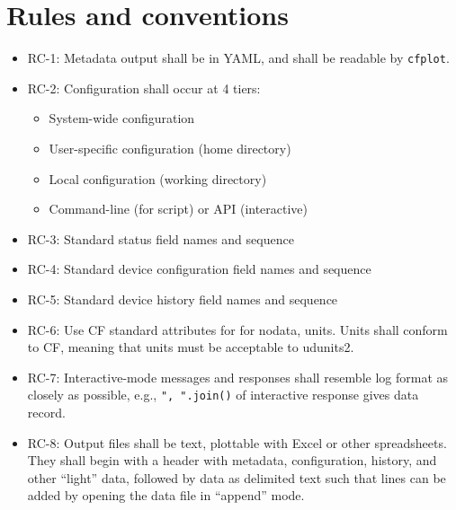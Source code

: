 \documentclass[pdftex,oneside,12pt,a4paper]{book}
\newcommand\linesep{1.68}
\begin{document}
\chapter{Rules and conventions}
\begin{itemize}
\item RC-1: Metadata output shall be in YAML, and shall be readable by \texttt{cfplot}.
\item RC-2: Configuration shall occur at 4 tiers:
  \begin{itemize}
  \item System-wide configuration
  \item User-specific configuration (home directory)
  \item Local configuration (working directory)
  \item Command-line (for script) or API (interactive)
  \end{itemize}
\item RC-3: Standard status field names and sequence
\item RC-4: Standard device configuration field names and sequence
\item RC-5: Standard device history field names and sequence
\item RC-6: Use CF standard attributes for for nodata, units. Units shall conform to CF, meaning that units must be acceptable to udunits2.
\item RC-7: Interactive-mode messages and responses shall resemble log format as closely as possible, e.g., \verb|", ".join()| of interactive response gives data record.
\item RC-8: Output files shall be text, plottable with Excel or other spreadsheets. They shall begin with a header with metadata, configuration, history, and other ``light'' data, followed by data as delimited text such that lines can be added by opening the data file in ``append'' mode.
\end{itemize}


%
%

\end{document}

